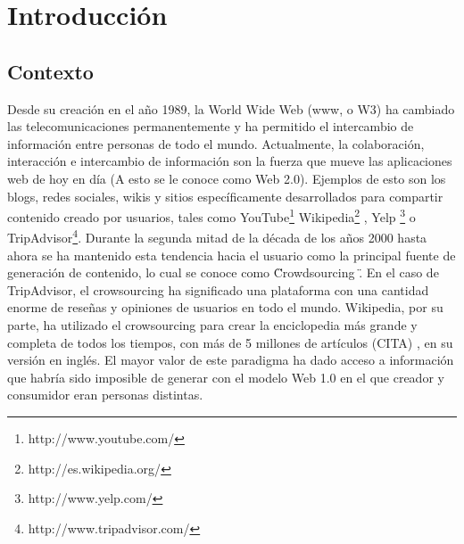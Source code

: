 \chapter*{Introducci\'on}


\section{Contexto}

Desde su creación en el año 1989, la World Wide Web (www, o W3) ha cambiado las telecomunicaciones permanentemente y ha permitido el intercambio de información entre personas de todo el mundo. Actualmente, la colaboración, interacción e intercambio de información son la fuerza que mueve las aplicaciones web de hoy en día (A esto se le conoce como Web 2.0).  Ejemplos de esto son los blogs, redes sociales, wikis y sitios específicamente desarrollados para compartir contenido creado por usuarios, tales como YouTube\footnote{http://www.youtube.com/} Wikipedia\footnote{http://es.wikipedia.org/} ,  Yelp \footnote{http://www.yelp.com/} o  TripAdvisor\footnote{http://www.tripadvisor.com/}. 
Durante la segunda mitad de la década de los años 2000 hasta ahora se ha mantenido esta tendencia hacia el usuario como la principal fuente de generación de contenido, lo cual se conoce como \" Crowdsourcing \". En el caso de TripAdvisor, el crowsourcing ha significado una plataforma con una cantidad enorme de reseñas y opiniones de usuarios en todo el mundo. Wikipedia, por su parte, ha utilizado el crowsourcing para crear la enciclopedia más grande y completa de todos los tiempos, con más de 5 millones de artículos (CITA) , en su versión en inglés.  El mayor valor de este paradigma ha dado acceso a información que habría sido imposible de generar con el modelo Web 1.0 en el que creador y consumidor eran personas distintas. 